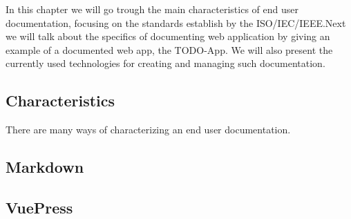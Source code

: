 In this chapter we will go trough the main characteristics of end user documentation, focusing on the standards establish by the ISO/IEC/IEEE.\@ Next we will talk about the specifics of documenting web application by giving an example of a documented web app, the TODO-App. We will also present the currently used technologies for creating and managing such documentation.

\subsection{Characteristics}\label{sec:char}
There are many ways of characterizing an end user documentation.
\subsection{Markdown}\label{sec:MD}
\subsection{VuePress}\label{sec:VP}

